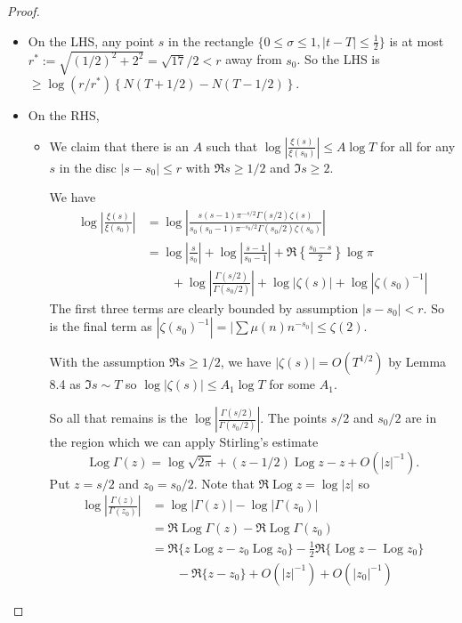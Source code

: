 \documentclass[12pt]{article}
\newcommand{\Abs}[1]{\left| #1 \right|}
\newcommand{\Log}{\operatorname{Log}}
\begin{document}
\begin{proof}
\begin{itemize}
\item On the LHS, any point $s$ in the rectangle $\{0 \leq \sigma \leq 1, |t - T| \leq \frac{1}{2} \}$ is at most $r^* := \sqrt{(1/2)^2 + 2^2} = \sqrt{17}/2 < r$ away from $s_0$. So the LHS is $\geq \log(r/r^*) \left\{ N(T + 1/2) - N(T - 1/2) \right\}$.

\item On the RHS,

\begin{itemize}
\item We claim that there is an $A$ such that $\log \Abs{\frac{\xi(s)}{\xi(s_0)}} \leq A \log T$ for all for any $s$ in the disc $|s - s_0| \leq r$ with $\Re s \geq 1/2$ and $\Im s \geq 2$.

We have
\begin{align*}
\log \Abs{ \frac{\xi(s)}{\xi(s_0)} } &= \log \Abs{ \frac{s (s - 1) \pi^{-s/2} \Gamma(s/2) \zeta(s)}{s_0 (s_0 - 1) \pi^{-s_0/2} \Gamma(s_0/2) \zeta(s_0)} } \\
&= \log \Abs{ \frac{s}{s_0} } + \log \Abs{ \frac{s - 1}{s_0 - 1} } + \Re\left\{\frac{s_0 - s}{2}\right\} \log \pi \\
&\qquad + \log \Abs{ \frac{\Gamma(s/2)}{\Gamma(s_0/2)} } + \log |\zeta(s)| + \log |\zeta(s_0)^{-1}|
\end{align*}
The first three terms are clearly bounded by assumption $|s - s_0| < r$. So is the final term as $|\zeta(s_0)^{-1}| = |\sum \mu(n) n^{-s_0}| \leq \zeta(2)$.

With the assumption $\Re s \geq 1/2$, we have $|\zeta(s)| = O(T^{1/2})$ by Lemma 8.4 as $\Im s \sim T$ so $\log |\zeta(s)| \leq A_1 \log T$ for some $A_1$.

So all that remains is the $\log \Abs{ \frac{\Gamma(s/2)}{\Gamma(s_0/2)} }$. The points $s/2$ and $s_0/2$ are in the region which we can apply Stirling's estimate
$$\Log \Gamma(z) = \log\sqrt{2\pi} + (z - 1/2) \Log z - z + O(|z|^{-1}).$$
Put $z = s/2$ and $z_0 = s_0/2$. Note that $\Re \Log z = \log |z|$ so
\begin{align*}
\log \Abs{ \frac{\Gamma(z)}{\Gamma(z_0)} } &= \log |\Gamma(z)| - \log |\Gamma(z_0)|\\
&= \Re \Log \Gamma(z) - \Re \Log \Gamma(z_0)\\
&= \Re\{z \Log z - z_0 \Log z_0 \} - \frac12 \Re\{\Log z - \Log z_0 \} \\
& \qquad - \Re\{ z - z_0\} + O(|z|^{-1}) + O(|z_0|^{-1})
\end{align*}


\end{itemize}
\end{itemize}
\end{proof}
\end{document}
